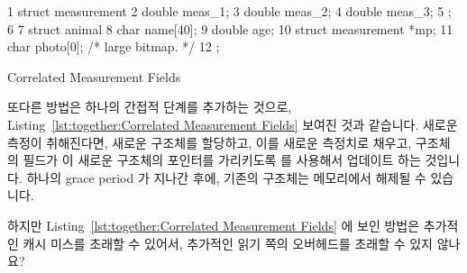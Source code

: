 \begin{listing}[tbp]
{ \scriptsize
\begin{verbbox}
 1 struct measurement {
 2   double meas_1;
 3   double meas_2;
 4   double meas_3;
 5 };
 6 
 7 struct animal {
 8   char name[40];
 9   double age;
10   struct measurement *mp;
11   char photo[0]; /* large bitmap. */
12 };
\end{verbbox}
}
\centering
\theverbbox
\caption{Correlated Measurement Fields}
\label{lst:together:Correlated Measurement Fields}
\end{listing}

또다른 방법은 하나의 간접적 단계를 추가하는 것으로,
Listing~\ref{lst:together:Correlated Measurement Fields} 보여진 것과 같습니다.
새로운 측정이 취해진다면, 새로운  구조체를 할당하고, 이를
새로운 측정치로 채우고,  구조체의  필드가 이 새로운
 구조체의 포인터를 가리키도록  를
사용해서 업데이트 하는 것입니다.
하나의 grace period 가 지나간 후에, 기존의  구조체는 메모리에서
해제될 수 있습니다.
\iffalse

Another approach is to insert a level of indirection, as shown in
Listing~\ref{lst:together:Correlated Measurement Fields}.
When a new measurement is taken, a new \co{measurement} structure
is allocated, filled in with the measurements, and the \co{animal}
structure's \co{->mp} field is updated to point to this new
\co{measurement} structure using \co{rcu_assign_pointer()}.
After a grace period elapses, the old \co{measurement} structure
can be freed.
\fi

\QuickQuiz{}
	하지만
	Listing~\ref{lst:together:Correlated Measurement Fields}
	에 보인 방법은 추가적인 캐시 미스를 초래할 수 있어서, 추가적인 읽기
	쪽의 오버헤드를 초래할 수 있지 않나요?
	\iffalse


